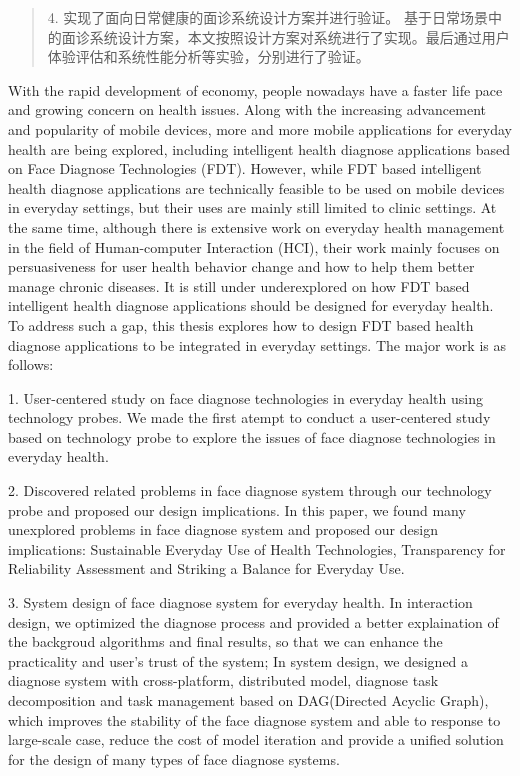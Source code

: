 \documentclass[oneside,type=master]{fduthesis}
\begin{document}
\begin{abstract}
4. 实现了面向日常健康的面诊系统设计方案并进行验证。
基于日常场景中的面诊系统设计方案，本文按照设计方案对系统进行了实现。最后通过用户体验评估和系统性能分析等实验，分别进行了验证。

\end{abstract}

\begin{abstract*}

With the rapid development of economy, people nowadays have a faster life pace and growing concern on health issues. 
Along with the increasing advancement and popularity of mobile devices, more and more mobile applications for everyday health are being explored, including intelligent health diagnose applications based on Face Diagnose Technologies (FDT). However, while FDT based intelligent health diagnose applications are technically feasible to be used on mobile devices in everyday settings, but their uses are mainly still limited to clinic settings. At the same time, although there is extensive work on everyday health management in the field of Human-computer Interaction (HCI), their work mainly focuses on persuasiveness for user health behavior change and how to help them better manage chronic diseases. It is still under underexplored on how FDT based intelligent health diagnose applications should be designed for everyday health.
To address such a gap, this thesis explores how to design FDT based health diagnose applications to be integrated in everyday settings. The major work is as follows: 

1. User-centered study on face diagnose technologies in everyday health using technology probes.
We made the first atempt to conduct a user-centered study based on technology probe to explore the issues of face diagnose technologies in everyday health.

2. Discovered related problems in face diagnose system through our technology probe and proposed our design implications.
In this paper, we found many unexplored problems in face diagnose system and proposed our design implications: Sustainable Everyday Use of Health Technologies, Transparency for Reliability Assessment and Striking a Balance for Everyday Use. 

3. System design of face diagnose system for everyday health.
In interaction design, we optimized the diagnose process and provided a better explaination of the backgroud algorithms and final results, so that we can enhance the practicality and user's trust of the system;
In system design, we designed a diagnose system with cross-platform, distributed model, diagnose task decomposition and task management based on DAG(Directed Acyclic Graph), which improves the stability of the face diagnose system and able to response to large-scale case, reduce the cost of model iteration and provide a unified solution for the design of many types of face diagnose systems.


\end{abstract*}
\end{document}
